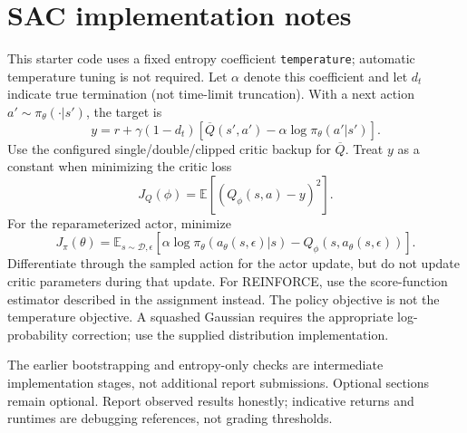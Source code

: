 \newpage
\section{SAC implementation notes}
This starter code uses a fixed entropy coefficient \texttt{temperature}; automatic temperature tuning is not required. Let $\alpha$ denote this coefficient and let $d_t$ indicate true termination (not time-limit truncation). With a next action $a'\sim\pi_\theta(\cdot|s')$, the target is
\[
y=r+\gamma(1-d_t)\left[\overline Q(s',a')-\alpha\log\pi_\theta(a'|s')\right].
\]
Use the configured single/double/clipped critic backup for $\overline Q$. Treat $y$ as a constant when minimizing the critic loss
\[
J_Q(\phi)=\mathbb E\left[(Q_\phi(s,a)-y)^2\right].
\]
For the reparameterized actor, minimize
\[
J_\pi(\theta)=\mathbb E_{s\sim\mathcal D,\epsilon}
\left[\alpha\log\pi_\theta(a_\theta(s,\epsilon)|s)-Q_\phi(s,a_\theta(s,\epsilon))\right].
\]
Differentiate through the sampled action for the actor update, but do not update critic parameters during that update. For REINFORCE, use the score-function estimator described in the assignment instead. The policy objective is not the temperature objective. A squashed Gaussian requires the appropriate log-probability correction; use the supplied distribution implementation.

The earlier bootstrapping and entropy-only checks are intermediate implementation stages, not additional report submissions. Optional sections remain optional. Report observed results honestly; indicative returns and runtimes are debugging references, not grading thresholds.


